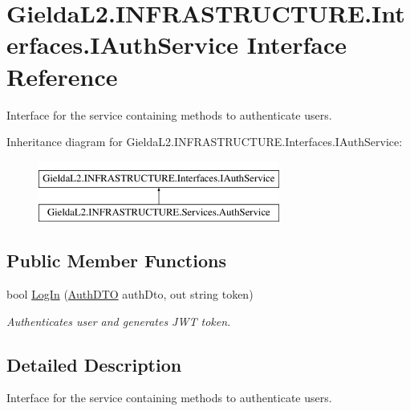 \hypertarget{interface_gielda_l2_1_1_i_n_f_r_a_s_t_r_u_c_t_u_r_e_1_1_interfaces_1_1_i_auth_service}{}\section{Gielda\+L2.\+I\+N\+F\+R\+A\+S\+T\+R\+U\+C\+T\+U\+R\+E.\+Interfaces.\+I\+Auth\+Service Interface Reference}
\label{interface_gielda_l2_1_1_i_n_f_r_a_s_t_r_u_c_t_u_r_e_1_1_interfaces_1_1_i_auth_service}


Interface for the service containing methods to authenticate users.  


Inheritance diagram for Gielda\+L2.\+I\+N\+F\+R\+A\+S\+T\+R\+U\+C\+T\+U\+R\+E.\+Interfaces.\+I\+Auth\+Service\+:\begin{figure}[H]
\begin{center}
\leavevmode
\includegraphics[height=2.000000cm]{interface_gielda_l2_1_1_i_n_f_r_a_s_t_r_u_c_t_u_r_e_1_1_interfaces_1_1_i_auth_service}
\end{center}
\end{figure}
\subsection*{Public Member Functions}
\begin{DoxyCompactItemize}
\item 
bool \mbox{\hyperlink{interface_gielda_l2_1_1_i_n_f_r_a_s_t_r_u_c_t_u_r_e_1_1_interfaces_1_1_i_auth_service_a9228c59864a95e038b513ee771f398bb}{Log\+In}} (\mbox{\hyperlink{class_gielda_l2_1_1_i_n_f_r_a_s_t_r_u_c_t_u_r_e_1_1_d_t_o_1_1_auth_d_t_o}{Auth\+D\+TO}} auth\+Dto, out string token)
\begin{DoxyCompactList}\small\item\em Authenticates user and generates J\+WT token. \end{DoxyCompactList}\end{DoxyCompactItemize}


\subsection{Detailed Description}
Interface for the service containing methods to authenticate users. 



